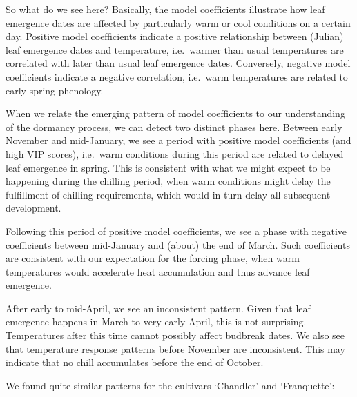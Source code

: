 \documentclass[
]{book}
\begin{document}
So what do we see here? Basically, the model coefficients illustrate how leaf emergence dates are affected by particularly warm or cool conditions on a certain day. Positive model coefficients indicate a positive relationship between (Julian) leaf emergence dates and temperature, i.e.~warmer than usual temperatures are correlated with later than usual leaf emergence dates. Conversely, negative model coefficients indicate a negative correlation, i.e.~warm temperatures are related to early spring phenology.

When we relate the emerging pattern of model coefficients to our understanding of the dormancy process, we can detect two distinct phases here. Between early November and mid-January, we see a period with positive model coefficients (and high VIP scores), i.e.~warm conditions during this period are related to delayed leaf emergence in spring. This is consistent with what we might expect to be happening during the chilling period, when warm conditions might delay the fulfillment of chilling requirements, which would in turn delay all subsequent development.

Following this period of positive model coefficients, we see a phase with negative coefficients between mid-January and (about) the end of March. Such coefficients are consistent with our expectation for the forcing phase, when warm temperatures would accelerate heat accumulation and thus advance leaf emergence.

After early to mid-April, we see an inconsistent pattern. Given that leaf emergence happens in March to very early April, this is not surprising. Temperatures after this time cannot possibly affect budbreak dates. We also see that temperature response patterns before November are inconsistent. This may indicate that no chill accumulates before the end of October.

We found quite similar patterns for the cultivars `Chandler' and `Franquette':
\end{document}
